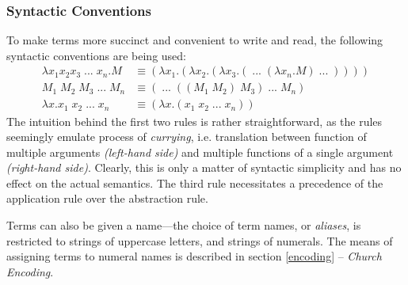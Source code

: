 \documentclass[a4paper,10pt]{article}
\begin{document}
\subsubsection{Syntactic Conventions} \label{sec:conventions}
To make terms more succinct and convenient to write and read, the 
following syntactic conventions are being used:
\begin{align*}
	\lambda x_1 x_2 x_3\;...\;x_n.M &\equiv (\lambda x_1.(\lambda x_2.(\lambda x_3.(\;...\;(\lambda x_n.M)\;...\;))))\\
	M_1\;M_2\;M_3\;...\;M_n &\equiv (\;...\;((M_1\;M_2)\;M_3)\;...\;M_n)\\
	\lambda x.x_1\;x_2\;...\;x_n &\equiv (\lambda x.(x_1\;x_2\;...\;x_n))
\end{align*}
The intuition behind the first two rules is rather straightforward, as the rules
seemingly emulate process of \textit{currying}, i.e.
translation between function of multiple arguments \textit{(left-hand side)} and multiple
functions of a single argument \textit{(right-hand side)}. Clearly, this is only
a matter of syntactic simplicity and has no effect on the actual semantics.
The third rule necessitates a precedence of the application rule over the abstraction rule.

Terms can also be given a name---the choice of term names, or \textit{aliases}, is restricted to 
strings of uppercase letters, and strings of numerals.
The means of assigning terms to numeral names is described in section \ref{encoding} -- \textit{Church Encoding}.
\end{document}
